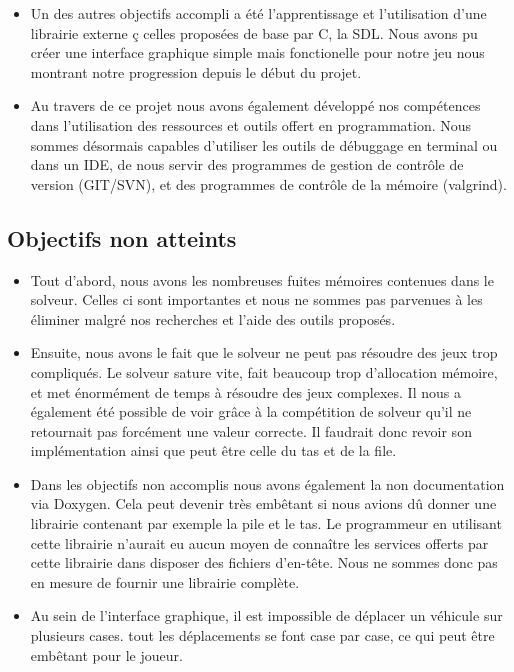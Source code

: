\documentclass{article}
\begin{document}
\begin{itemize}
\item Un des autres objectifs accompli a été l'apprentissage et l'utilisation d'une librairie externe ç celles proposées de base par C, la SDL. Nous avons pu créer une interface graphique simple mais fonctionelle pour notre jeu nous montrant notre progression depuis le début du projet.\\

\item Au travers de ce projet nous avons également développé nos compétences dans l'utilisation des ressources et outils offert en programmation. Nous sommes désormais capables d'utiliser les outils de débuggage en terminal ou dans un IDE, de nous servir des programmes de gestion de contrôle de version (GIT/SVN), et des programmes de contrôle de la mémoire (valgrind).\newpage
\end{itemize}

\subsection {Objectifs non atteints}
\begin{itemize}
\item Tout d'abord, nous avons les nombreuses fuites mémoires contenues dans le solveur. Celles ci sont importantes et nous ne sommes pas parvenues à les éliminer malgré nos recherches et l'aide des outils proposés.\\

\item Ensuite, nous avons le fait que le solveur ne peut pas résoudre des jeux trop compliqués. Le solveur sature vite, fait beaucoup trop d'allocation mémoire, et met énormément de temps à résoudre des jeux complexes. Il nous a également été possible de voir grâce à la compétition de solveur qu'il ne retournait pas forcément une valeur correcte. Il faudrait donc revoir son implémentation ainsi que peut être celle du tas et de la file.\\

\item Dans les objectifs non accomplis nous avons également la non documentation via Doxygen. Cela peut devenir très embêtant si nous avions dû donner une librairie contenant par exemple la pile et le tas. Le programmeur en utilisant cette librairie n'aurait eu aucun moyen de connaître les services offerts par cette librairie dans disposer des fichiers d'en-tête. Nous ne sommes donc pas en mesure de fournir une librairie complète.\\

\item Au sein de l'interface graphique, il est impossible de déplacer un véhicule sur plusieurs cases. tout les déplacements se font case par case, ce qui peut être embêtant pour le joueur.

\end{itemize}
\end{document}
